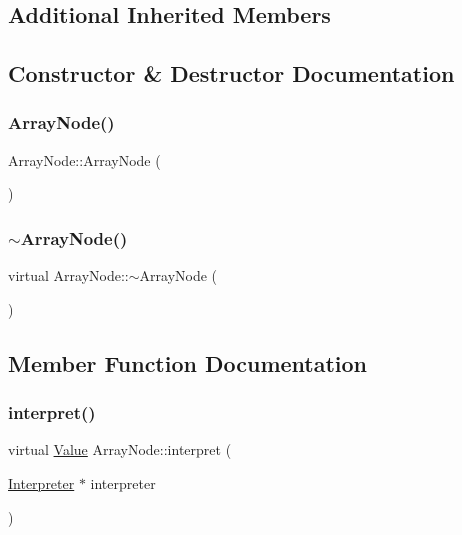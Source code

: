 \subsection*{Additional Inherited Members}


\subsection{Constructor \& Destructor Documentation}
\mbox{\label{classArrayNode_adfb4eb2c05953007bb2af001141a2109}} 
\subsubsection{\texorpdfstring{Array\+Node()}{ArrayNode()}}
{\footnotesize\ttfamily Array\+Node\+::\+Array\+Node (\begin{DoxyParamCaption}{ }\end{DoxyParamCaption})}

\mbox{\label{classArrayNode_aa45e4fbc84eab2f8731feefdc99bd639}} 
\subsubsection{\texorpdfstring{$\sim$\+Array\+Node()}{~ArrayNode()}}
{\footnotesize\ttfamily virtual Array\+Node\+::$\sim$\+Array\+Node (\begin{DoxyParamCaption}{ }\end{DoxyParamCaption})\hspace{0.3cm}{\ttfamily [virtual]}}



\subsection{Member Function Documentation}
\mbox{\label{classArrayNode_a029220b946233e22cb661fcfac9634d0}} 
\subsubsection{\texorpdfstring{interpret()}{interpret()}}
{\footnotesize\ttfamily virtual \hyperlink{classValue}{Value} Array\+Node\+::interpret (\begin{DoxyParamCaption}\item[{\hyperlink{classInterpreter}{Interpreter} $\ast$}]{interpreter }\end{DoxyParamCaption})\hspace{0.3cm}{\ttfamily [virtual]}}



